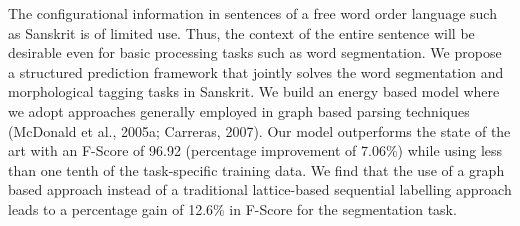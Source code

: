 The configurational information in sentences of a free word order language such as Sanskrit is of limited use. Thus, the context of the entire sentence will be desirable even for basic processing tasks such as word segmentation. We propose a structured prediction framework that  jointly solves the word segmentation and morphological tagging tasks in Sanskrit. We build an energy based model where we adopt approaches generally employed in graph based parsing techniques (McDonald et al., 2005a; Carreras, 2007). Our model outperforms the state of the art with an F-Score of 96.92 (percentage improvement of 7.06\%) while using less than one tenth of the task-specific training data. We find that the use of a graph based approach instead of a traditional lattice-based sequential labelling approach leads to a percentage gain of 12.6\% in F-Score for the segmentation task.
